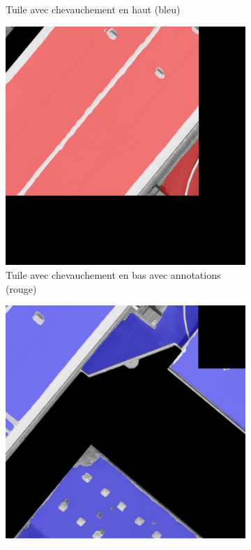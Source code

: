 \begin{figure}[H]
\begin{subfigure}[b]{0.49\textwidth}
        \caption{Tuile avec chevauchement en haut (bleu)}
        \label{fig:ch3_postprocessing_dataset_13_validation_chevauchement_bas2}
    \end{subfigure}
    \begin{subfigure}[b]{0.49\textwidth}
        \centering
        \includegraphics[width=\textwidth]{02-main/figures/ch3/ch3_postprocessing_dataset_14_validation_chevauchement_bas3.png}
        \caption{Tuile avec chevauchement en bas avec annotations (rouge)}
        \label{fig:ch3_postprocessing_dataset_14_validation_chevauchement_bas3}
    \end{subfigure}
    \hfill
    \begin{subfigure}[b]{0.49\textwidth}
        \centering
        \includegraphics[width=\textwidth]{02-main/figures/ch3/ch3_postprocessing_dataset_15_validation_chevauchement_bas4.png}

\end{subfigure}
\end{figure}
